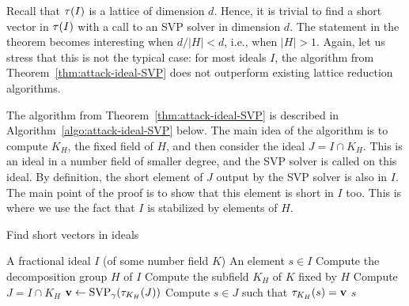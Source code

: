 Recall that $\tau(I)$ is a lattice of dimension $d$. Hence, it is trivial to find a short vector in $\tau(I)$ with a call to an SVP solver in dimension $d$. The statement in the theorem becomes interesting when $d/|H| < d$, i.e., when $|H| > 1$. Again, let us stress that this is not the typical case: for most ideals $I$, the algorithm from Theorem~\ref{thm:attack-ideal-SVP} does not outperform existing lattice reduction algorithms.

The algorithm from Theorem~\ref{thm:attack-ideal-SVP} is described in Algorithm~\ref{algo:attack-ideal-SVP} below. The main idea of the algorithm is to compute $K_H$, the fixed field of $H$, and then consider the ideal $J = I \cap K_H$. This is an ideal in a number field of smaller degree, and the SVP solver is called on this ideal. By definition, the short element of $J$ output by the SVP solver is also in $I$. The main point of the proof is to show that this element is short in $I$ too. This is where we use the fact that $I$ is stabilized by elements of $H$.

\begin{algorithm}
\caption{Find short vectors in ideals}
\label{algo:attack-ideal-SVP}
\begin{algorithmic}[1]
\REQUIRE A fractional ideal $I$ (of some number field $K$)
\ENSURE An element $s \in I$
\STATE Compute the decomposition group $H$ of $I$
\STATE Compute the subfield $K_H$ of $K$ fixed by $H$
\STATE Compute $J = I \cap K_H$
\STATE $\mathbf v \leftarrow \text{SVP}_\gamma(\tau_{K_H}(J))$ \label{step:SVP}
\STATE Compute $s \in J$ such that $\tau_{K_H}(s) = \mathbf v$
\RETURN $s$
\end{algorithmic}
\end{algorithm} 

